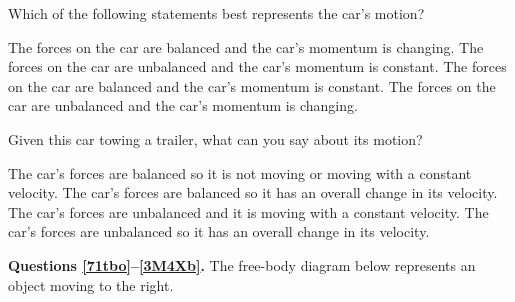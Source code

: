 \documentclass[answers]{exam}
\newif\ifversionKlevel
\begin{document}
\begin{questions}
Which of the following statements best represents the car’s motion?

\begin{randomizechoices}[norandomize]
    \choice The forces on the car are balanced and the car’s momentum is changing.			
    \choice The forces on the car are unbalanced and the car’s momentum is constant.
    \choice The forces on the car are balanced and the car’s momentum is constant.
    \correctchoice The forces on the car are unbalanced and the car’s momentum is changing.
\end{randomizechoices}

\question
Given this car towing a trailer, what can you say about its motion?

\begin{center}
\end{center}

\begin{randomizechoices}[norandomize]
    \choice The car’s forces are balanced so it is not moving or moving with a constant velocity.
    \choice The car’s forces are balanced so it has an overall change in its velocity.
    \choice The car’s forces are unbalanced and it is moving with a constant velocity.
    \correctchoice The car’s forces are unbalanced so it has an overall change in its velocity.    
\end{randomizechoices}


\ifversionKlevel
\begin{EnvUplevel}
    \textbf{Questions \ref{71tbo}--\ref{3M4Xb}.} The free-body diagram below represents an object moving to the right.
\end{EnvUplevel}


\begin{center}
\end{center}


\end{questions}
\end{document}
